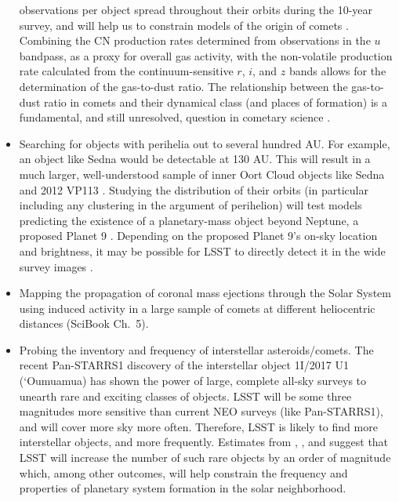 \begin{itemize}
observations per object spread throughout their orbits during the 10-year
survey, and will help us to constrain models of the origin of comets
\citep{2010PhDT.......241S,2016AJ....152..103S}.  Combining the CN production
rates determined from observations in the $u$ bandpass, as a proxy for overall
gas activity, with the non-volatile production rate calculated from the
continuum-sensitive $r$, $i$, and $z$ bands allows for the determination of the
gas-to-dust ratio.  The relationship between the gas-to-dust ratio in comets
and their dynamical class (and places of formation) is a fundamental, and still
unresolved, question in cometary science \citep[see
e.g.,][]{1995Icar..118..223A,2017RSPTA.37560252B}.
\item Searching for objects with perihelia out to several hundred AU. For example, an object
like Sedna \citep{2004ApJ...617..645B} would be detectable at 130 AU. This will result
in a much larger, well-understood sample of inner Oort Cloud objects like Sedna and 2012 VP113
 \citep{2014Natur.507..471T}.  Studying the distribution of their orbits (in particular including any
clustering in the argument of perihelion) will test models predicting the existence of a planetary-mass object beyond Neptune, a proposed Planet 9 \citep{2014Natur.507..471T,2016AJ....151...22B,2016ApJ...824L..23B,2016AJ....152..221S,2017AJ....154...65B}. Depending on the proposed Planet 9's on-sky location and brightness, it may be possible for LSST to directly detect it in the wide survey images \citep{2016AJ....151...22B,2016ApJ...824L..23B,2016AJ....152..221S,2017AJ....154...65B}.

\item Mapping the propagation of coronal mass ejections through the
  Solar System using induced
 activity in a large sample of comets at different heliocentric distances
(SciBook Ch.~5).
\item Probing the inventory and frequency of  interstellar
  asteroids/comets. The recent Pan-STARRS1 discovery of the interstellar object
1I/2017 U1 (`Oumuamua)
\citep{2017MPEC....U..181B} has shown the power
of large, complete all-sky surveys to unearth
rare and exciting classes of objects. LSST will be some three magnitudes more sensitive
than  current NEO surveys (like Pan-STARRS1), and will cover more sky more
often. Therefore, LSST is likely to find more interstellar objects, and more frequently.
Estimates from  \citet{2016ApJ...825...51C},  \citet{2017AJ....153..133E}, and \citet{2017ApJ...850L..38T} suggest that LSST will increase the number of  such rare objects by an order of magnitude which, among other outcomes, will help
constrain the frequency and properties of planetary system formation in the solar neighborhood.
\end{itemize}


